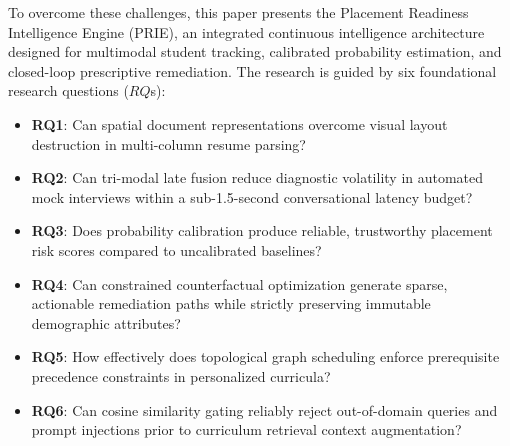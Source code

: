 \documentclass[conference]{IEEEtran}
\begin{document}
To overcome these challenges, this paper presents the Placement Readiness Intelligence Engine (PRIE), an integrated continuous intelligence architecture designed for multimodal student tracking, calibrated probability estimation, and closed-loop prescriptive remediation. The research is guided by six foundational research questions ($RQ$s):
\begin{itemize}
\item \textbf{RQ1}: Can spatial document representations overcome visual layout destruction in multi-column resume parsing?
\item \textbf{RQ2}: Can tri-modal late fusion reduce diagnostic volatility in automated mock interviews within a sub-1.5-second conversational latency budget?
\item \textbf{RQ3}: Does probability calibration produce reliable, trustworthy placement risk scores compared to uncalibrated baselines?
\item \textbf{RQ4}: Can constrained counterfactual optimization generate sparse, actionable remediation paths while strictly preserving immutable demographic attributes?
\item \textbf{RQ5}: How effectively does topological graph scheduling enforce prerequisite precedence constraints in personalized curricula?
\item \textbf{RQ6}: Can cosine similarity gating reliably reject out-of-domain queries and prompt injections prior to curriculum retrieval context augmentation?
\end{itemize}
\end{document}
